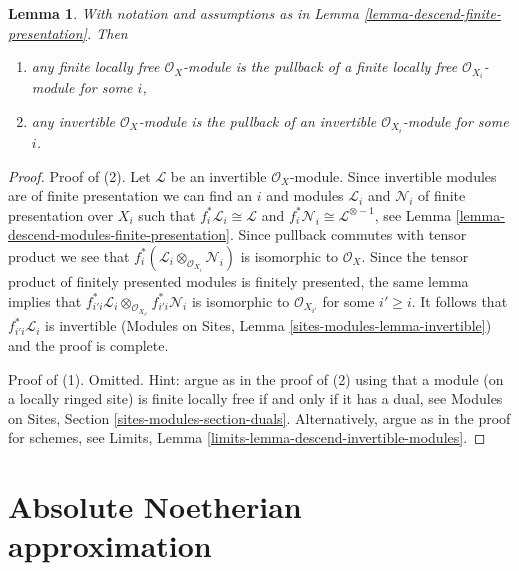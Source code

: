 \documentclass{stacks-project}
\theoremstyle{plain}
\newtheorem{lemma}[subsection]{Lemma}
\theoremstyle{definition}
\theoremstyle{remark}
\numberwithin{equation}{subsection}
\begin{document}
\begin{lemma}
\label{lemma-descend-invertible-modules}
With notation and assumptions as in
Lemma \ref{lemma-descend-finite-presentation}. Then
\begin{enumerate}
\item any finite locally free $\mathcal{O}_X$-module is the pullback
of a finite locally free $\mathcal{O}_{X_i}$-module for some $i$,
\item any invertible $\mathcal{O}_X$-module is the pullback of an invertible
$\mathcal{O}_{X_i}$-module for some $i$.
\end{enumerate}
\end{lemma}

\begin{proof}
Proof of (2).
Let $\mathcal{L}$ be an invertible $\mathcal{O}_X$-module. Since
invertible modules are of finite presentation we can find an $i$
and modules $\mathcal{L}_i$ and $\mathcal{N}_i$ of finite presentation
over $X_i$ such that $f_i^*\mathcal{L}_i \cong \mathcal{L}$ and
$f_i^*\mathcal{N}_i \cong \mathcal{L}^{\otimes -1}$, see
Lemma \ref{lemma-descend-modules-finite-presentation}.
Since pullback commutes with tensor product we see that
$f_i^*(\mathcal{L}_i \otimes_{\mathcal{O}_{X_i}} \mathcal{N}_i)$
is isomorphic to $\mathcal{O}_X$. Since the tensor product of
finitely presented modules is finitely presented, the same
lemma implies that
$f_{i'i}^*\mathcal{L}_i
\otimes_{\mathcal{O}_{X_{i'}}} f_{i'i}^*\mathcal{N}_i$
is isomorphic to $\mathcal{O}_{X_{i'}}$ for some $i' \geq i$.
It follows that $f_{i'i}^*\mathcal{L}_i$ is invertible
(Modules on Sites, Lemma \ref{sites-modules-lemma-invertible})
and the proof is complete.

\medskip\noindent
Proof of (1). Omitted. Hint: argue as in the proof of (2)
using that a module (on a locally ringed site) is finite locally free
if and only if it has a dual, see
Modules on Sites, Section \ref{sites-modules-section-duals}.
Alternatively, argue as in the proof for schemes, see
Limits, Lemma \ref{limits-lemma-descend-invertible-modules}.
\end{proof}














\section{Absolute Noetherian approximation}
\label{section-approximation}
\end{document}
